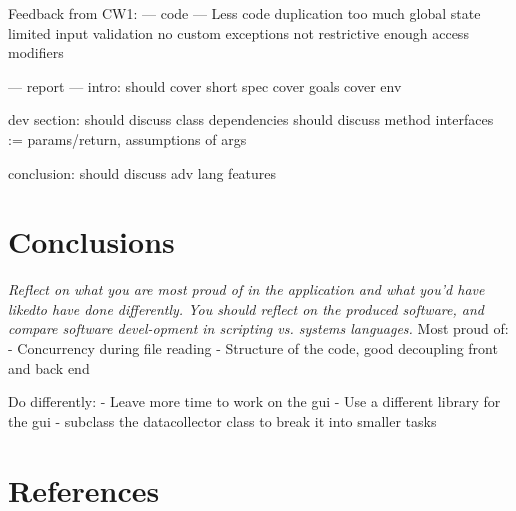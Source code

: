 \documentclass[11pt]{article}
\begin{document}
Feedback from CW1:
 --- code ---
Less code duplication
too much global state
limited input validation
no custom exceptions
not restrictive enough access modifiers

--- report ---
intro:
    should cover short spec
    cover goals
    cover env

dev section:
    should discuss class dependencies
    should discuss method interfaces := params/return, assumptions of args

conclusion:
    should discuss adv lang features




\section{Conclusions}
\emph{Reflect on what you are most proud of in the application and what you’d have likedto have done differently.  You should reflect on the produced software, and compare software devel-opment in scripting vs.  systems languages.}
Most proud of:
- Concurrency during file reading
- Structure of the code, good decoupling front and back end

Do differently:
- Leave more time to work on the gui
- Use a different library for the gui
- subclass the datacollector class to break it into smaller tasks


\pagebreak
\appendix
\section{References}
\printbibliography
\end{document}
